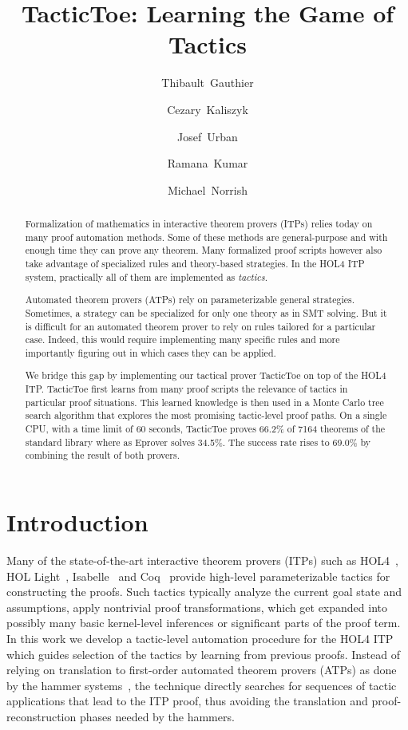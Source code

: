 \documentclass[runningheads,a4paper,draft]{svjour3}
\title{TacticToe: Learning the Game of Tactics}
\author{\mbox{Thibault Gauthier} \and \mbox{Cezary Kaliszyk} \and \mbox{Josef 
Urban} \and \mbox{Ramana Kumar} \and \mbox{Michael Norrish}}
\institute{Thibault Gauthier and Cezary Kaliszyk \at
Department of Computer Science, University of Innsbruck,
Innsbruck, Austria\\ \url{{thibault.gauthier,cezary.kaliszyk}@uibk.ac.at}
\and
Josef Urban \at Czech Technical University, Prague\\\url{josef.urban@gmail.com}
\and Ramana Kumar and Michael Norrish \at Data61}
\def\holfour{\textsf{HOL4}\xspace}
\def\isabelle{\textsf{Isabelle}\xspace}
\def\hollight{\textsf{HOL Light}\xspace}
\def\coq{\textsf{Coq}\xspace}
\begin{document}
\maketitle

\begin{abstract}
Formalization of mathematics in interactive theorem provers (ITPs) 
relies today on many proof automation methods.
Some of these methods are general-purpose and with enough time they can prove any 
theorem. Many formalized proof scripts however also
take advantage of specialized rules and theory-based strategies. 
In the HOL4 ITP system, practically all of them are implemented as \emph{tactics}. 

Automated theorem provers (ATPs) rely on parameterizable general 
strategies. Sometimes, a strategy can be specialized for only one theory as in 
SMT solving. But it is difficult for an automated theorem prover to rely on 
rules tailored for a particular case. 
Indeed, this would require implementing many specific rules and more 
importantly figuring out in which cases they can be applied. 

We bridge this gap by implementing our tactical prover TacticToe on top 
of the HOL4 ITP. 
TacticToe first learns from many proof scripts
the relevance of tactics in particular proof situations.
This learned knowledge is then used in a Monte Carlo tree search algorithm that explores the most promising tactic-level proof paths. 
On a single CPU, with a time limit of 60 seconds, TacticToe proves 66.2\% 
of 7164 theorems of the standard library where as 
Eprover solves 34.5\%. The success rate rises to 69.0\% by combining the 
result of both provers.
\end{abstract}

\section{Introduction}
\tableofcontents

Many of the state-of-the-art interactive theorem provers (ITPs) such as
  \holfour~\cite{hol4}, \hollight~\cite{Harrison09hollight}, 
  \isabelle~\cite{isabelle} 
  and \coq~\cite{coq-book}
  provide high-level parameterizable tactics for constructing the
  proofs.  Such tactics typically analyze the current goal state and
  assumptions, apply nontrivial proof transformations, which get
  expanded into possibly many basic kernel-level inferences or significant 
  parts of the proof term.
  In this
  work we develop a tactic-level automation procedure for the \holfour ITP
  which guides selection of the tactics by learning from previous
  proofs.  Instead of relying on translation to first-order automated
  theorem provers (ATPs) as done by the hammer 
  systems~\cite{hammers4qed,tgck-cpp15}, the technique
  directly searches for sequences of tactic applications that lead to
  the ITP proof, thus avoiding the translation and
  proof-reconstruction phases needed by the hammers.
\end{document}
